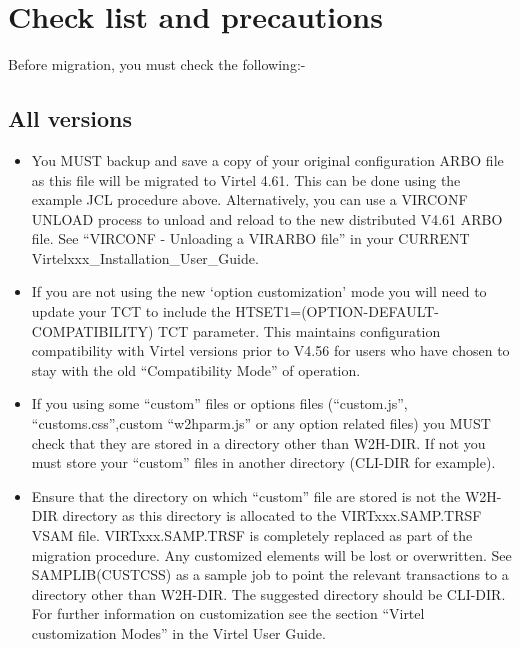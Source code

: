 \documentclass[letterpaper,10pt,english]{sphinxmanual}
\begin{document}

\newpage

\ignorespaces 

\chapter{Check list and precautions}
\label{\detokenize{Migration_Guide:check-list-and-precautions}}\label{\detokenize{Migration_Guide:index-2}}
Before migration, you must check the following:-


\section{All versions}
\label{\detokenize{Migration_Guide:all-versions}}\begin{itemize}
\item {} 
You MUST backup and save a copy of your original configuration ARBO file as this file will be migrated to Virtel 4.61. This can be done using the example JCL procedure above. Alternatively, you can use a VIRCONF UNLOAD process to unload and reload to the new distributed V4.61 ARBO file. See “VIRCONF - Unloading a VIRARBO file” in your CURRENT Virtelxxx\_Installation\_User\_Guide.

\item {} 
If you are not using the new ‘option customization’ mode you will need to update your TCT to include the HTSET1=(OPTION-DEFAULT-COMPATIBILITY) TCT parameter. This maintains configuration compatibility with Virtel versions prior to V4.56 for users who have chosen to stay with the old “Compatibility Mode” of operation.

\item {} 
If you using some “custom” files or options files (“custom.js”, “customs.css”,custom “w2hparm.js” or any option related files) you MUST check that they are stored in a directory other than W2H-DIR. If not you must store your “custom” files in another directory (CLI-DIR for example).

\item {} 
Ensure that the directory on which “custom” file are stored is not the W2H-DIR directory as this directory is allocated to the VIRTxxx.SAMP.TRSF VSAM file. VIRTxxx.SAMP.TRSF is completely replaced as part of the migration procedure. Any customized elements will be lost or overwritten. See SAMPLIB(CUSTCSS) as a sample job to point the relevant transactions to a directory other than W2H-DIR. The suggested directory should be CLI-DIR. For further information on customization see the section “Virtel customization Modes” in the Virtel User Guide.

\end{itemize}
\end{document}
